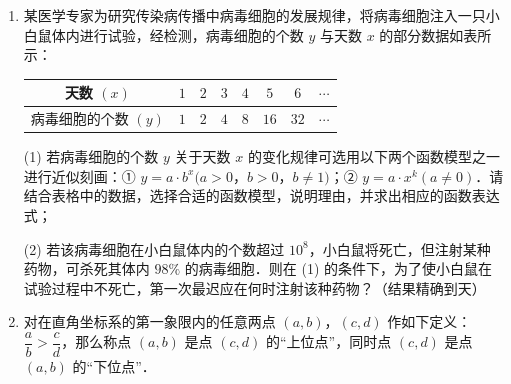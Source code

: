 \begin{enumerate}
\item 某医学专家为研究传染病传播中病毒细胞的发展规律，将病毒细胞注入一只小白鼠体内进行试验，经检测，病毒细胞的个数 $y$ 与天数 $x$ 的部分数据如表所示：

\begin{center}
\begin{tabular}{|c|c|c|c|c|c|c|c|}
\hline
天数 $(x)$ & $1$ & $2$ & $3$ & $4$ & $5$ & $6$ & $\cdots$ \\
\hline
病毒细胞的个数 $(y)$ & $1$ & $2$ & $4$ & $8$ & $16$ & $32$ & $\cdots$ \\
\hline
\end{tabular}
\end{center}

(1) 若病毒细胞的个数 $y$ 关于天数 $x$ 的变化规律可选用以下两个函数模型之一进行近似刻画：① $y=a\cdot b^x(a>0$，$b>0$，$b\neq1)$；② $y=a\cdot x^k(a\neq0)$．请结合表格中的数据，选择合适的函数模型，说明理由，并求出相应的函数表达式；

(2) 若该病毒细胞在小白鼠体内的个数超过 $10^8$，小白鼠将死亡，但注射某种药物，可杀死其体内 $98\%$ 的病毒细胞．则在 (1) 的条件下，为了使小白鼠在试验过程中不死亡，第一次最迟应在何时注射该种药物？（结果精确到天）

\ifanswer
\solbegin
{}
\solend
\fi

\item 对在直角坐标系的第一象限内的任意两点 $(a,b)$，$(c,d)$ 作如下定义：$\dfrac ab>\dfrac cd$，那么称点 $(a,b)$ 是点 $(c,d)$ 的“上位点”，同时点 $(c,d)$ 是点 $(a,b)$ 的“下位点”．


\end{enumerate}
